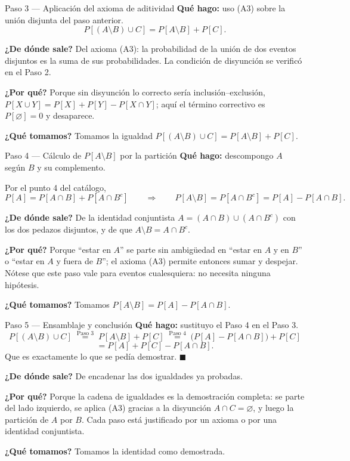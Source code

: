\documentclass[11pt]{article}
\begin{document}
\begin{sol}
\begin{paso}{Paso 3 --- Aplicaci\'on del axioma de aditividad}
\textbf{Qu\'e hago:} uso (A3) sobre la uni\'on disjunta del paso anterior.
\[
P[(A\setminus B)\cup C]=P[A\setminus B]+P[C].
\]

\textbf{¿De d\'onde sale?} Del axioma (A3): la probabilidad de la uni\'on de dos eventos disjuntos es la suma de sus probabilidades. La condici\'on de disyunci\'on se verific\'o en el Paso 2.

\textbf{¿Por qu\'e?} Porque sin disyunci\'on lo correcto ser\'ia inclusi\'on--exclusi\'on, $P[X\cup Y]=P[X]+P[Y]-P[X\cap Y]$; aqu\'i el t\'ermino correctivo es $P[\varnothing]=0$ y desaparece.

\textbf{¿Qu\'e tomamos?} Tomamos la igualdad $P[(A\setminus B)\cup C]=P[A\setminus B]+P[C]$.
\end{paso}

\begin{paso}{Paso 4 --- C\'alculo de $P[A\setminus B]$ por la partici\'on}
\textbf{Qu\'e hago:} descompongo $A$ seg\'un $B$ y su complemento.

Por el punto 4 del cat\'alogo,
\[
P[A]=P[A\cap B]+P[A\cap B^{c}]
\qquad\Longrightarrow\qquad
P[A\setminus B]=P[A\cap B^{c}]=P[A]-P[A\cap B].
\]

\textbf{¿De d\'onde sale?} De la identidad conjuntista $A=(A\cap B)\cup(A\cap B^{c})$ con los dos pedazos disjuntos, y de que $A\setminus B=A\cap B^{c}$.

\textbf{¿Por qu\'e?} Porque ``estar en $A$'' se parte sin ambig\"uedad en ``estar en $A$ y en $B$'' o ``estar en $A$ y fuera de $B$''; el axioma (A3) permite entonces sumar y despejar. N\'otese que este paso vale para eventos cualesquiera: no necesita ninguna hip\'otesis.

\textbf{¿Qu\'e tomamos?} Tomamos $P[A\setminus B]=P[A]-P[A\cap B]$.
\end{paso}

\begin{paso}{Paso 5 --- Ensamblaje y conclusi\'on}
\textbf{Qu\'e hago:} sustituyo el Paso 4 en el Paso 3.
\[
P[(A\setminus B)\cup C]
\;\overset{\text{Paso 3}}{=}\;
P[A\setminus B]+P[C]
\;\overset{\text{Paso 4}}{=}\;
\bigl(P[A]-P[A\cap B]\bigr)+P[C]
\]
\[
=P[A]+P[C]-P[A\cap B].
\]
Que es exactamente lo que se ped\'ia demostrar. $\blacksquare$

\textbf{¿De d\'onde sale?} De encadenar las dos igualdades ya probadas.

\textbf{¿Por qu\'e?} Porque la cadena de igualdades es la demostraci\'on completa: se parte del lado izquierdo, se aplica (A3) gracias a la disyunci\'on $A\cap C=\varnothing$, y luego la partici\'on de $A$ por $B$. Cada paso est\'a justificado por un axioma o por una identidad conjuntista.

\textbf{¿Qu\'e tomamos?} Tomamos la identidad como demostrada.
\end{paso}

\end{sol}
\end{document}

